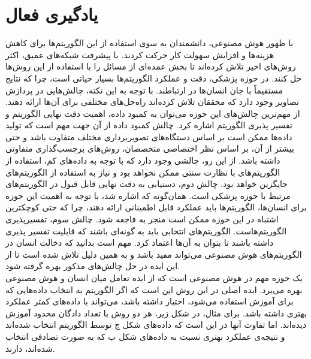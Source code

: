 \section{یادگیری فعال}
با ظهور هوش مصنوعی، دانشمندان به سوی استفاده از این الگوریتم‌ها برای کاهش هزینه‌ها و افزایش سهولت کار حرکت کردند. با پیشرفت شبکه‌های عمیق، اکثر روش‌های اخیر تلاش کرده‌اند تا بخش عمده‌ای از مسائل را با استفاده از این روش‌ها حل کنند. در حوزه پزشکی، دقت و عملکرد الگوریتم‌ها بسیار حیاتی است، چرا که نتایج مستقیماً با جان انسان‌ها در ارتباطند. با توجه به این نکته، چالش‌هایی در پردازش تصاویر وجود دارد که محققان تلاش کرده‌اند راه‌حل‌های مختلفی برای آن‌ها ارائه دهند. از مهم‌ترین چالش‌های این حوزه می‌توان به کمبود داده، اهمیت دقت نهایی الگوریتم و تفسیر پذیری الگوریتم اشاره کرد. چالش کمبود داده از آن جهت مهم است که تولید داده‌ها ممکن است بر اساس دستگاه‌های تصویربرداری مختلف متفاوت باشد و حتی بیشتر از آن، بر اساس نظر اختصاصی متخصصان، روش‌های برچسب‌گذاری متفاوتی داشته باشد. از این رو، چالشی وجود دارد که با توجه به داده‌های کم، استفاده از الگوریتم‌های با نظارت سنتی ممکن نخواهد بود و نیاز به استفاده از الگوریتم‌های جایگزین خواهد بود. چالش دوم، دستیابی به دقت نهایی قابل قبول در الگوریتم‌های مرتبط با حوزه پزشکی است. همان‌گونه که اشاره شد، با توجه به اهمیت این حوزه برای انسان‌ها، الگوریتم‌ها باید عملکرد قابل اطمینانی ارائه دهند، چرا که حتی کوچکترین اشتباه در این حوزه ممکن است منجر به فاجعه شود. چالش سوم، تفسیر‌پذیری الگوریتم‌هاست. الگوریتم‌های انتخابی باید به گونه‌ای باشند که قابلیت تفسیر پذیری داشته باشند تا بتوان به آن‌ها اعتماد کرد. مهم است بدانید که دخالت انسان در الگوریتم‌های هوش مصنوعی می‌تواند مفید باشد و به همین دلیل تلاش شده است تا از این ایده در حل چالش‌های مذکور بهره گرفته شود.
\\
 یک حوزه مهم در هوش مصنوعی است که از ایده تعامل میان انسان و هوش مصنوعی بهره می‌برد. ایده اصلی در این روش این است که اگر الگوریتم به انتخاب داده‌هایی که برای آموزش استفاده می‌شود، اختیار داشته باشد، می‌تواند با داده‌های کمتر عملکرد بهتری داشته باشد. برای مثال، در شکل زیر، هر دو روش با تعداد دادگان محدود آموزش دیده‌اند. اما تفاوت آنها در این است که داده‌های شکل ج توسط الگوریتم انتخاب شده‌اند و نتیجه‌ی عملکرد بهتری نسبت به داده‌های شکل ب که به صورت تصادفی انتخاب شده‌اند، دارند.

